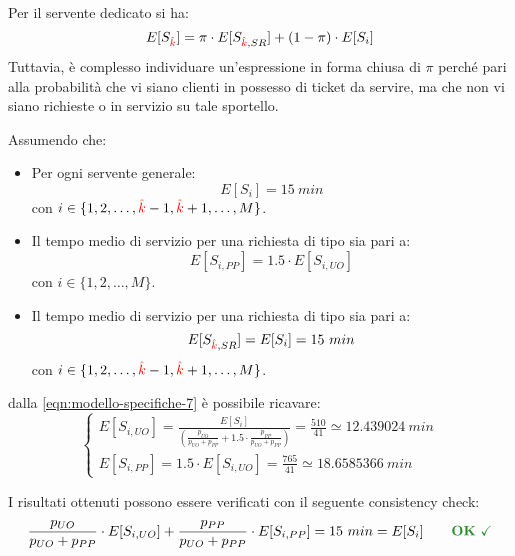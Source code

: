 Per il servente dedicato si ha:
\begin{equation}
\label{eqn:modello-specifiche-8}
E[S_{\color{red}\hat{k}}] = \pi \cdot E[S_{{\color{red}\hat{k}}, SR}] + (1-\pi) \cdot E[S_i]
\end{equation}
Tuttavia, è complesso individuare un'espressione in forma chiusa di $\pi$ perché pari alla probabilità che vi siano clienti in possesso di ticket \sr{} da servire, ma che non vi siano richieste \uo{} o \pp{} in servizio su tale sportello.

\newpage

Assumendo che:
\begin{itemize}
\item Per ogni servente generale:
\begin{equation}
\label{eqn:modello-specifiche-9}
E[S_i] = 15\ min
\end{equation}
con $i \in \lbrace 1, 2, \dots, {\color{red}\hat{k}}-1, {\color{red}\hat{k}}+1, \dots, M\rbrace$.
\item Il tempo medio di servizio per una richiesta di tipo \pp{} sia pari a:
\begin{equation}
E[S_{i, PP}] = 1.5 \cdot E[S_{i, UO}]
\end{equation}
con $i \in \lbrace 1, 2, \dots, M\rbrace$.
\item Il tempo medio di servizio per una richiesta di tipo \sr{} sia pari a:
\begin{equation}
\label{eqn:modello-specifiche-11}
E[S_{{\color{red}\hat{k}}, SR}] = E[S_i] = 15\ min
\end{equation}
con $i \in \lbrace 1, 2, \dots, {\color{red}\hat{k}}-1, {\color{red}\hat{k}}+1, \dots, M\rbrace$.
\end{itemize}
dalla \ref{eqn:modello-specifiche-7} è possibile ricavare:
\begin{equation}
\label{eqn:modello-specifiche-12}
\begin{cases}
E[S_{i,UO}] = \frac{E[S_i]}{(\frac{p_{UO}}{p_{UO} + p_{PP}} + 1.5\cdot \frac{p_{PP}}{p_{UO} + p_{PP}})} = \frac{510}{41} \simeq 12.439024\ min \\[2em]
E[S_{i,PP}] = 1.5\cdot E[S_{i,UO}] = \frac{765}{41} \simeq 18.6585366\ min
\end{cases}
\end{equation}

I risultati ottenuti possono essere verificati con il seguente consistency check:
\begin{equation}
\frac{p_{UO}}{p_{UO} + p_{PP}} \cdot E[S_{i, UO}] +  \frac{p_{PP}}{p_{UO} + p_{PP}} \cdot E[S_{i, PP}] = 15\ min = E[S_i]\qquad \text{\color{forestgreen}\textbf{OK} \checkmark}
\end{equation}

